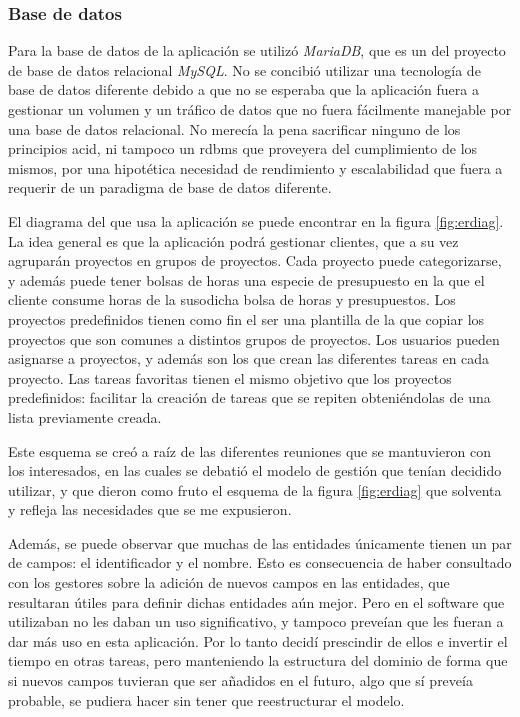 \subsubsection{Base de datos}
Para la base de datos de la aplicación se utilizó \textit{MariaDB}, que es un
 del proyecto de base de datos relacional \textit{MySQL}.
No se concibió utilizar una tecnología de base de datos diferente debido a
que no se esperaba que la aplicación fuera a gestionar un volumen y un tráfico
de datos que no fuera fácilmente manejable por una base de datos relacional. No
merecía la pena sacrificar ninguno de los principios \gls{acid}, ni tampoco un
\gls{rdbms} que proveyera del cumplimiento de los mismos, por una hipotética
necesidad de rendimiento y escalabilidad que fuera a requerir de un paradigma
de base de datos diferente.

El diagrama del  que usa la
aplicación se puede encontrar en la figura \ref{fig:erdiag}. La idea general es
que la aplicación podrá gestionar clientes, que a su vez agruparán proyectos
en grupos de proyectos. Cada proyecto puede categorizarse, y además puede tener
bolsas de horas \textemdash una especie de presupuesto en la que el cliente
consume horas de la susodicha bolsa de horas \textemdash y presupuestos. Los
proyectos predefinidos tienen como fin el ser una plantilla de la que copiar
los proyectos que son comunes a distintos grupos de proyectos. Los usuarios
pueden asignarse a proyectos, y además son los que crean las diferentes tareas
en cada proyecto. Las tareas favoritas tienen el mismo objetivo que los
proyectos predefinidos: facilitar la creación de tareas que se repiten
obteniéndolas de una lista previamente creada.

Este esquema se creó a raíz de las diferentes reuniones que se mantuvieron con
los interesados, en las cuales se debatió el modelo de gestión que tenían
decidido utilizar, y que dieron como fruto el esquema de la figura
\ref{fig:erdiag} que solventa y refleja las necesidades que se me expusieron.

Además, se puede observar que muchas de las entidades únicamente tienen un
par de campos: el identificador y el nombre. Esto es consecuencia de haber
consultado con los gestores sobre la adición de nuevos campos en las entidades,
que resultaran útiles para definir dichas entidades aún mejor. Pero en el
software que utilizaban no les daban un uso significativo, y tampoco preveían
que les fueran a dar más uso en esta aplicación. Por lo tanto decidí prescindir
de ellos e invertir el tiempo en otras tareas, pero manteniendo la estructura
del dominio de forma que si nuevos campos tuvieran que ser añadidos en el
futuro, algo que sí preveía probable, se pudiera hacer sin tener que
reestructurar el modelo.

